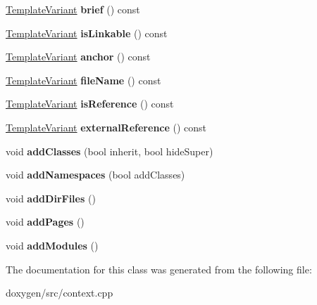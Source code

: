 \begin{DoxyCompactItemize}
\mbox{\label{class_nesting_node_context_1_1_private_a873fb7340c46d470adb32a2816b57245}} 
\mbox{\hyperlink{class_template_variant}{Template\+Variant}} {\bfseries brief} () const
\item 
\mbox{\label{class_nesting_node_context_1_1_private_a8bf560c09857534da9b50abd3d9aef17}} 
\mbox{\hyperlink{class_template_variant}{Template\+Variant}} {\bfseries is\+Linkable} () const
\item 
\mbox{\label{class_nesting_node_context_1_1_private_a06bfcb6c272cb6b4b9fbf53fd3d2c9f6}} 
\mbox{\hyperlink{class_template_variant}{Template\+Variant}} {\bfseries anchor} () const
\item 
\mbox{\label{class_nesting_node_context_1_1_private_a540c8972a8917450257e129257b7600c}} 
\mbox{\hyperlink{class_template_variant}{Template\+Variant}} {\bfseries file\+Name} () const
\item 
\mbox{\label{class_nesting_node_context_1_1_private_a53207c514ead93cc8f463caadfd0cbc3}} 
\mbox{\hyperlink{class_template_variant}{Template\+Variant}} {\bfseries is\+Reference} () const
\item 
\mbox{\label{class_nesting_node_context_1_1_private_acdf392cc9a7b0e8eabcedf8f57c98dc7}} 
\mbox{\hyperlink{class_template_variant}{Template\+Variant}} {\bfseries external\+Reference} () const
\item 
\mbox{\label{class_nesting_node_context_1_1_private_ae743fd0e019340de9d88d0d06ded1a14}} 
void {\bfseries add\+Classes} (bool inherit, bool hide\+Super)
\item 
\mbox{\label{class_nesting_node_context_1_1_private_a3fc8a869a7ceaed7e8f555a982c8a326}} 
void {\bfseries add\+Namespaces} (bool add\+Classes)
\item 
\mbox{\label{class_nesting_node_context_1_1_private_a6febf1fe002a5c7a981ca427dbd1cb94}} 
void {\bfseries add\+Dir\+Files} ()
\item 
\mbox{\label{class_nesting_node_context_1_1_private_a0a475a7bdce9149fd9da99041efed8ca}} 
void {\bfseries add\+Pages} ()
\item 
\mbox{\label{class_nesting_node_context_1_1_private_a9667340174e7b99f769db10b78478a5e}} 
void {\bfseries add\+Modules} ()
\end{DoxyCompactItemize}


The documentation for this class was generated from the following file\+:\begin{DoxyCompactItemize}
\item 
doxygen/src/context.\+cpp\end{DoxyCompactItemize}
